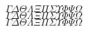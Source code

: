 \documentclass[12pt]{article}
\begin{document}
\[
\Gamma \Delta \Theta \Lambda \Xi \Pi \Sigma \Upsilon \Phi \Psi \Omega
\]
\italicupcasegreek
\[
\Gamma \Delta \Theta \Lambda \Xi \Pi \Sigma \Upsilon \Phi \Psi \Omega
\]
\uprightupcasegreek
\[
\Gamma \Delta \Theta \Lambda \Xi \Pi \Sigma \Upsilon \Phi \Psi \Omega
\]
\end{document}
